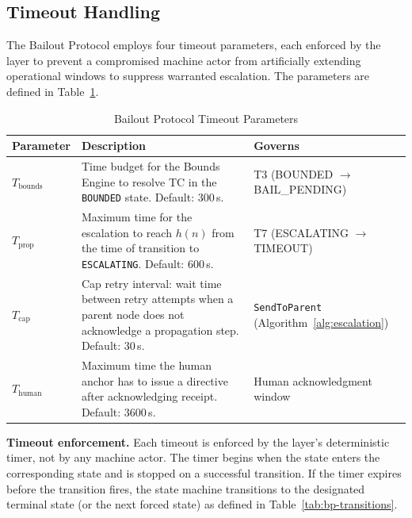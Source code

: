 \subsection{Timeout Handling}
\label{sec:timeout-handling}

The Bailout Protocol employs four timeout parameters, each enforced by the \fact{} layer to prevent a compromised machine actor from artificially extending operational windows to suppress warranted escalation. The parameters are defined in Table~\ref{tab:bp-timeouts}.

\begin{table}[t]
\caption{Bailout Protocol Timeout Parameters}
\label{tab:bp-timeouts}
\medskip
\noindent\begin{tabular}{lp{5.5cm}l}
\toprule
\textbf{Parameter} & \textbf{Description} & \textbf{Governs} \\
\midrule
$T_{\text{bounds}}$ & Time budget for the Bounds Engine to resolve TC in the \texttt{BOUNDED} state. Default: $300\,$s. & T3 (BOUNDED $\rightarrow$ BAIL\_PENDING) \\
$T_{\text{prop}}$ & Maximum time for the escalation to reach $h(n)$ from the time of transition to \texttt{ESCALATING}. Default: $600\,$s. & T7 (ESCALATING $\rightarrow$ TIMEOUT) \\
$T_{\text{cap}}$ & Cap retry interval: wait time between retry attempts when a parent node does not acknowledge a propagation step. Default: $30\,$s. & \texttt{SendToParent} (Algorithm~\ref{alg:escalation}) \\
$T_{\text{human}}$ & Maximum time the human anchor has to issue a directive after acknowledging receipt. Default: $3600\,$s. & Human acknowledgment window \\
\midrule
\end{tabular}
\end{table}

\medskip
\noindent\textbf{Timeout enforcement.} Each timeout is enforced by the \fact{} layer's deterministic timer, not by any machine actor. The timer begins when the state enters the corresponding state and is stopped on a successful transition. If the timer expires before the transition fires, the state machine transitions to the designated terminal state (or the next forced state) as defined in Table~\ref{tab:bp-transitions}.

